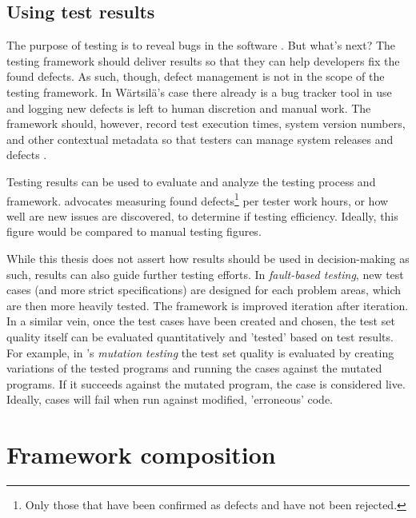 \documentclass[12pt,a4paper,oneside,pdftex]{report}
\begin{document}
\subsection{Using test results}
The purpose of testing is to reveal bugs in the software \citep{burnstein2003practical}. But what's next? The testing framework should deliver results so that they can help developers fix the found defects. As such, though, defect management is not in the scope of the testing framework. In Wärtsilä's case there already is a bug tracker tool in use and logging new defects is left to human discretion and manual work. The framework should, however, record test execution times, system version numbers, and other contextual metadata so that testers can manage system releases and defects \citep{jenkins2008software}.

Testing results can be used to evaluate and analyze the testing process and framework. \citet{jenkins2008software} advocates measuring found defects\footnote{Only those that have been confirmed as defects and have not been rejected.} per tester work hours, or how well are new issues are discovered, to determine if testing efficiency. Ideally, this figure would be compared to manual testing figures. \citep{jenkins2008software, fewster1999software}

While this thesis does not assert how results should be used in decision-making as such, results can also guide further testing efforts. In \emph{fault-based testing}, new test cases (and more strict specifications) are designed for each problem areas, which are then more heavily tested. \citep{pezze2008software} The framework is improved iteration after iteration. In a similar vein, once the test cases have been created and chosen, the test set quality itself can be evaluated quantitatively and 'tested' based on test results. For example, in \citeauthor{delamaro2001interface}'s \citeyearpar{delamaro2001interface} \emph{mutation testing} the test set quality is evaluated by creating variations of the tested programs and running the cases against the mutated programs. If it succeeds against the mutated program, the case is considered live. Ideally, cases will fail when run against modified, 'erroneous' code. 

\section{Framework composition}
\end{document}
